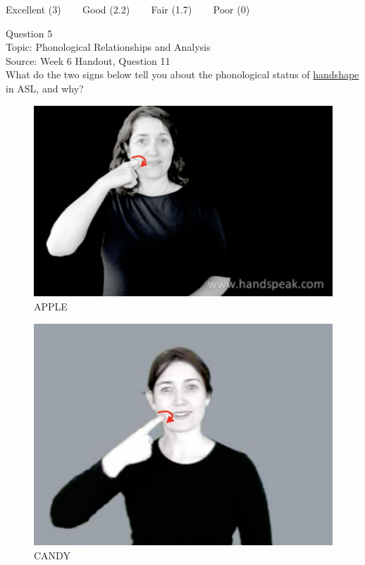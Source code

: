 \documentclass[12pt]{article}
\begin{document}
\vfill
Excellent (3) ~~~ Good (2.2) ~~~ Fair (1.7) ~~~ Poor (0)
\newpage

{\large Question 5}\\

Topic: Phonological Relationships and Analysis\\
Source: Week 6 Handout, Question 11\\

What do the two signs below tell you about the phonological status of \underline{handshape} in ASL, and why?\\

\begin{figure}[H]
\includegraphics{../images/asl_apple.png}
\caption{APPLE}
\end{figure}
\begin{figure}[H]
\includegraphics{../images/asl_candy.png}
\caption{CANDY}
\end{figure}
\end{document}
